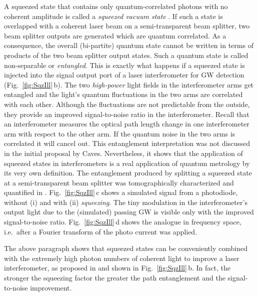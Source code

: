 A squeezed state that contains only quantum-correlated photons with no coherent amplitude is called a \textit{squeezed vacuum state} \cite{GerryKnight}. If such a state is overlapped with a coherent laser beam on a semi-transparent beam splitter, two beam splitter outputs are generated which are quantum correlated. As a consequence, the overall (bi-partite) quantum state cannot be written in terms of products of the two beam splitter output states. Such a quantum state is called non-separable or \textit{entangled}. This is exactly what happens if a squeezed state is injected into the signal output port of a laser interferometer for GW detection (Fig.~\ref{fig:SqzIll}\,b). The two \textit{high-power} light fields in the interferometer arms get entangled and the light's quantum fluctuations in the two arms are correlated with each other. Although the fluctuations are not predictable from the outside, they provide an improved signal-to-noise ratio in the interferometer. Recall that an interferometer measures the optical path length change in one interferometer arm with respect to the other arm. If the quantum noise in the two arms is correlated it will cancel out.
This entanglement interpretation was not discussed in the initial proposal by Caves.  Nevertheless, it shows that the application of squeezed states in interferometers is a real application of quantum metrology by its very own definition. The entanglement produced by splitting a squeezed state at a semi-transparent beam splitter was tomographically characterized and quantified in \cite{DiGuglielmo2007}. Fig.~\ref{fig:SqzIll}\,c shows a simulated signal from a photodiode, without (i) and with (ii) \textit{squeezing}. The tiny modulation in the interferometer's output light due to the (simulated) passing GW is visible only with the improved signal-to-noise ratio. Fig.~\ref{fig:SqzIll}\,d shows the analogue in frequency space, i.e.\ after a Fourier transform of the photo current was applied.

The above paragraph shows that squeezed states can be conveniently combined with the extremely
high photon numbers of coherent light to improve a laser interferometer, as proposed in \cite{Caves1981}
and shown in Fig.~\ref{fig:SqzIll}\,b. In fact, the stronger the squeezing
factor \cite{Walls1983,GerryKnight} the greater the path entanglement and the signal-to-noise
improvement. %

